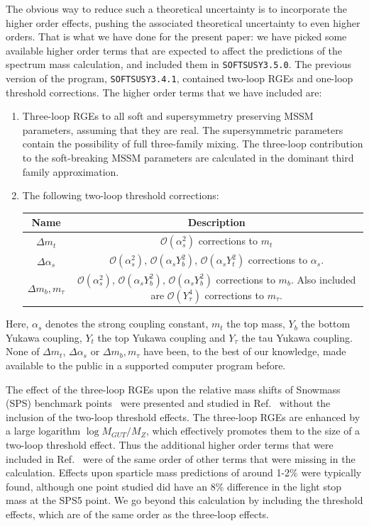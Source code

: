 \documentclass[final,3p,times,pdflatex]{elsarticle}
\begin{document}
The obvious way to reduce such a theoretical uncertainty is to incorporate the
higher order effects, pushing the associated theoretical uncertainty to even
higher orders.
That is what we have done for the present paper: we have
picked some available higher order terms that are expected to affect the
predictions of the spectrum mass calculation, and included them in
{\tt SOFTSUSY3.5.0}. The previous version of the program, {\tt SOFTSUSY3.4.1}, 
contained two-loop RGEs and one-loop threshold corrections. 
The higher order terms that we have included are: 
\begin{enumerate}
\item
Three-loop RGEs to all soft and supersymmetry preserving MSSM parameters, 
assuming that they are real. The supersymmetric parameters contain the
possibility of full three-family mixing. The three-loop contribution to the 
soft-breaking MSSM parameters are calculated in the dominant third family
approximation. 
\item
The following two-loop threshold corrections:
\begin{center}
\begin{tabular}{|c|c|}\hline
Name & Description \\ \hline
$\Delta m_t$ & $\mathcal O(\alpha_s^2)$ corrections to $m_t$ \\
 $\Delta \alpha_s$ & $\mathcal O(\alpha_s^2)$, $\mathcal O(\alpha_s Y_b^2)$,
 $\mathcal O(\alpha_s 
 Y_t^2)$ corrections to $\alpha_s$. \\
 $\Delta m_b, m_\tau$ & $\mathcal O(\alpha_s^2)$, $\mathcal O(\alpha_s Y_b^2)$, $\mathcal O(\alpha_s
 Y_b^2)$ corrections to $m_b$. Also included are $\mathcal O(Y_\tau^4)$
 corrections to $m_\tau$. \\
\hline \end{tabular}
\end{center}
\end{enumerate}
Here, $\alpha_s$ denotes the strong coupling constant, $m_t$ the top mass,
$Y_b$ the bottom Yukawa coupling, $Y_t$ the top Yukawa coupling and $Y_\tau$
the tau Yukawa coupling. 
None of $\Delta m_t$, $\Delta \alpha_s$ or $\Delta m_b, m_\tau$ have been, to
the best of our knowledge, made available to the public in a supported
computer program before. 

The effect of the three-loop RGEs upon the relative mass shifts 
of Snowmass (SPS) benchmark 
points~\cite{Allanach:2002nj} were presented and studied in 
Ref.~\cite{Jack:2004ch} 
without the inclusion of the two-loop threshold effects. 
The three-loop RGEs are enhanced by a large logarithm $\log M_{GUT}/M_Z$,
which effectively promotes them to the size of a two-loop threshold effect. 
Thus the additional higher order terms that were included in
Ref.~\cite{Jack:2004ch} were of the same order of other terms that were
missing in the calculation. Effects upon sparticle mass predictions of around
1-2$\%$ were typically found, although one point studied did have an 8$\%$
difference in the light stop mass at the SPS5 point. 
We go beyond this calculation by including the threshold effects, which are of
the same order as the three-loop effects.
\end{document}
